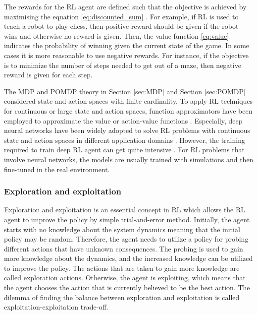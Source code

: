 \documentclass[english, 12pt, a4paper, elec, utf8, a-1b, online]{aaltothesis}
\begin{document}
The rewards for the RL agent are defined such that the objective is achieved by maximising the equation \eqref{eq:discounted_sum} \cite{Sutton2018}.
For example, if RL is used to teach a robot to play chess, then positive reward should be given if the robot wins and otherwise no reward is given.
Then, the value function \eqref{eq:value} indicates the probability of winning given the current state of the game.
In some cases it is more reasonable to use negative rewards.
For instance, if the objective is to minimize the number of steps needed to get out of a maze, then negative reward is given for each step. 

The MDP and POMDP theory in Section \ref{sec:MDP} and Section \ref{sec:POMDP} considered state and action spaces with finite cardinality.
To apply RL techniques for continuous or large state and action spaces, function approximators have been employed to approximate the value or action-value functions \cite{Sutton2018}. 
Especially, deep neural networks have been widely adopted to solve RL problems with continuous state and action spaces in different application domains \cite{Zhang2018, Luong2018}.
However, the training required to train deep RL agent can get quite intensive \cite{Irpan2018}.
For RL problems that involve neural networks, the models are usually trained with simulations and then fine-tuned in the real environment.

\subsubsection{Exploration and exploitation}

Exploration and exploitation is an essential concept in RL which allows the RL agent to improve the policy by simple trial-and-error method.
Initially, the agent starts with no knowledge about the system dynamics meaning that the initial policy may be random.
Therefore, the agent needs to utilize a policy for probing different actions that have unknown consequences.
The probing is used to gain more knowledge about the dynamics, and the increased knowledge can be utilized to improve the policy.
The actions that are taken to gain more knowledge are called exploration actions.
Otherwise, the agent is exploiting, which means that the agent chooses the action that is currently believed to be the best action.
The dilemma of finding the balance between exploration and exploitation is called exploitation-exploitation trade-off.
\end{document}

